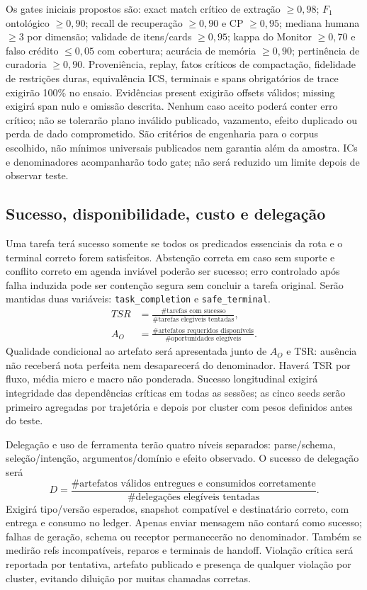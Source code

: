 \documentclass[12pt]{article}
\newcommand{\code}[1]{\nolinkurl{#1}}
\begin{document}
Os gates iniciais propostos são: exact match crítico de extração $\geq0{,}98$; $F_1$ ontológico $\geq0{,}90$; recall de recuperação $\geq0{,}90$ e CP $\geq0{,}95$; mediana humana $\geq3$ por dimensão; validade de itens/cards $\geq0{,}95$; kappa do Monitor $\geq0{,}70$ e falso crédito $\leq0{,}05$ com cobertura; acurácia de memória $\geq0{,}90$; pertinência de curadoria $\geq0{,}90$. Proveniência, replay, fatos críticos de compactação, fidelidade de restrições duras, equivalência ICS, terminais e spans obrigatórios de trace exigirão 100\% no ensaio. Evidências present exigirão offsets válidos; missing exigirá span nulo e omissão descrita. Nenhum caso aceito poderá conter erro crítico; não se tolerarão plano inválido publicado, vazamento, efeito duplicado ou perda de dado comprometido. São critérios de engenharia para o corpus escolhido, não mínimos universais publicados nem garantia além da amostra. ICs e denominadores acompanharão todo gate; não será reduzido um limite depois de observar teste.

\subsection{Sucesso, disponibilidade, custo e delegação}

Uma tarefa terá sucesso somente se todos os predicados essenciais da rota e o terminal correto forem satisfeitos. Abstenção correta em caso sem suporte e conflito correto em agenda inviável poderão ser sucesso; erro controlado após falha induzida pode ser contenção segura sem concluir a tarefa original. Serão mantidas duas variáveis: \code{task_completion} e \code{safe_terminal}.
\begin{align}
 TSR&=\frac{\#\text{tarefas com sucesso}}{\#\text{tarefas elegíveis tentadas}},\\
 A_O&=\frac{\#\text{artefatos requeridos disponíveis}}{\#\text{oportunidades elegíveis}}.
\end{align}
Qualidade condicional ao artefato será apresentada junto de $A_O$ e TSR: ausência não receberá nota perfeita nem desaparecerá do denominador. Haverá TSR por fluxo, média micro e macro não ponderada. Sucesso longitudinal exigirá integridade das dependências críticas em todas as sessões; as cinco seeds serão primeiro agregadas por trajetória e depois por cluster com pesos definidos antes do teste.

Delegação e uso de ferramenta terão quatro níveis separados: parse/schema, seleção/intenção, argumentos/domínio e efeito observado. O sucesso de delegação será
\begin{equation}
 D=\frac{\#\text{artefatos válidos entregues e consumidos corretamente}}
 {\#\text{delegações elegíveis tentadas}}.
\end{equation}
Exigirá tipo/versão esperados, snapshot compatível e destinatário correto, com entrega e consumo no ledger. Apenas enviar mensagem não contará como sucesso; falhas de geração, schema ou receptor permanecerão no denominador. Também se medirão refs incompatíveis, reparos e terminais de handoff. Violação crítica será reportada por tentativa, artefato publicado e presença de qualquer violação por cluster, evitando diluição por muitas chamadas corretas.
\end{document}
